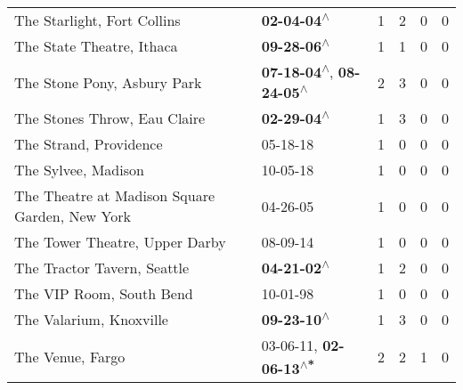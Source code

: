 \begin{supertabular}{p{0.4\textwidth}p{0.3\textwidth}p{0.05\textwidth}p{0.05\textwidth}p{0.05\textwidth}p{0.05\textwidth}}
                                                  The Starlight, Fort Collins &                                                 \textbf{02-04-04\textsuperscript{$\wedge$}} &  1 &  2 &  0 &  0 \\
                                                    The State Theatre, Ithaca &                                                 \textbf{09-28-06\textsuperscript{$\wedge$}} &  1 &  1 &  0 &  0 \\
                                                  The Stone Pony, Asbury Park &    \textbf{07-18-04\textsuperscript{$\wedge$}}, \textbf{08-24-05\textsuperscript{$\wedge$}} &  2 &  3 &  0 &  0 \\
                                                 The Stones Throw, Eau Claire &                                                 \textbf{02-29-04\textsuperscript{$\wedge$}} &  1 &  3 &  0 &  0 \\
                                                       The Strand, Providence &                                                                  05-18-18\textsuperscript{} &  1 &  0 &  0 &  0 \\
                                                          The Sylvee, Madison &                                                                  10-05-18\textsuperscript{} &  1 &  0 &  0 &  0 \\
                               The Theatre at Madison Square Garden, New York &                                                                  04-26-05\textsuperscript{} &  1 &  0 &  0 &  0 \\
                                               The Tower Theatre, Upper Darby &                                                                  08-09-14\textsuperscript{} &  1 &  0 &  0 &  0 \\
                                                  The Tractor Tavern, Seattle &                                                 \textbf{04-21-02\textsuperscript{$\wedge$}} &  1 &  2 &  0 &  0 \\
                                                     The VIP Room, South Bend &                                                                  10-01-98\textsuperscript{} &  1 &  0 &  0 &  0 \\
                                                      The Valarium, Knoxville &                                                 \textbf{09-23-10\textsuperscript{$\wedge$}} &  1 &  3 &  0 &  0 \\
                                                             The Venue, Fargo &                    03-06-11\textsuperscript{}, \textbf{02-06-13\textsuperscript{$\wedge$*}} &  2 &  2 &  1 &  0 \\

\end{supertabular}
